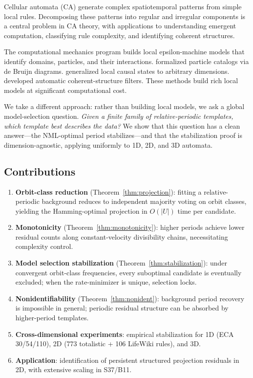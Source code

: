 \documentclass[letterpaper]{article}
\theoremstyle{definition}
\theoremstyle{remark}
\begin{document}
Cellular automata (CA) generate complex spatiotemporal patterns from simple local rules.
Decomposing these patterns into regular and irregular components is a central problem in CA theory, with applications to understanding emergent computation, classifying rule complexity, and identifying coherent structures.

The computational mechanics program \citep{crutchfield1997,hanson1992} builds local epsilon-machine models that identify domains, particles, and their interactions.
\citet{redeker2017} formalized particle catalogs via de Bruijn diagrams.
\citet{rupe2018} generalized local causal states to arbitrary dimensions.
\citet{shalizi2006} developed automatic coherent-structure filters.
These methods build rich local models at significant computational cost.

We take a different approach: rather than building local models, we ask a global model-selection question.
\emph{Given a finite family of relative-periodic templates, which template best describes the data?}
We show that this question has a clean answer---the NML-optimal period stabilizes---and that the stabilization proof is dimension-agnostic, applying uniformly to 1D, 2D, and 3D automata.

\subsection{Contributions}

\begin{enumerate}
    \item \textbf{Orbit-class reduction} (Theorem~\ref{thm:projection}): fitting a relative-periodic background reduces to independent majority voting on orbit classes, yielding the Hamming-optimal projection in $O(|U|)$ time per candidate.
    \item \textbf{Monotonicity} (Theorem~\ref{thm:monotonicity}): higher periods achieve lower residual counts along constant-velocity divisibility chains, necessitating complexity control.
    \item \textbf{Model selection stabilization} (Theorem~\ref{thm:stabilization}): under convergent orbit-class frequencies, every suboptimal candidate is eventually excluded; when the rate-minimizer is unique, selection locks.
    \item \textbf{Nonidentifiability} (Theorem~\ref{thm:nonident}): background period recovery is impossible in general; periodic residual structure can be absorbed by higher-period templates.
    \item \textbf{Cross-dimensional experiments}: empirical stabilization for 1D (ECA 30/54/110), 2D (773 totalistic + 106 LifeWiki rules), and 3D.
    \item \textbf{Application}: identification of persistent structured projection residuals in 2D, with extensive scaling in S37/B11.
\end{enumerate}
\end{document}
